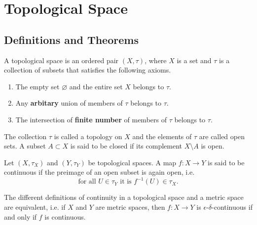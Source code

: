 \chapter{Topological Space}
\section{Definitions and Theorems}
\begin{defbox}
    \begin{definition}
        A {\color{maththen}topological space} is an {\color{mathobj}ordered pair} \((X, \tau)\), where \(X\) is a {\color{mathif}set} and \(\tau\) is a {\color{mathif}collection of subsets} that satisfies the following {\color{mathrem}axioms}.
        \begin{enumerate}
            \item The {\color{mathif}empty set} \(\varnothing\) and the {\color{mathif}entire set} \(X\) belongs to \(\tau\).
            \item Any \textbf{arbitary} {\color{mathif}union} of members of \(\tau\) belongs to \(\tau\).
            \item The {\color{mathif}intersection} of \textbf{finite number} of members of \(\tau\) belongs to \(\tau\).
        \end{enumerate}
        The {\color{mathobj}collection} \(\tau\) is called a {\color{maththen}topology} on \(X\) and the {\color{mathobj}elements} of \(\tau\) are called {\color{maththen}open sets}. A {\color{mathobj}subset} \(A \subset X\) is said to be {\color{maththen}closed} if its {\color{mathif}complement} \(X \setminus A\) is {\color{mathif}open}.
    \end{definition}
\end{defbox}

\begin{defbox}
    \begin{definition}
        Let \((X, \tau_X)\) and \((Y, \tau_Y)\) be {\color{mathif}topological spaces}. A {\color{mathif}map} \(f: X \longrightarrow Y\) is said to be {\color{maththen}continuous} if the preimage of an open subset is again open, i.e.
        \begin{equation}
            \text{for all } U \in \tau_Y \text{ it is } f^{-1}(U) \in \tau_X \text{.}
        \end{equation}
    \end{definition}
\end{defbox}
\begin{thmbox}
    \begin{lemma}
        The different definitions of continuity in a topological space and a metric space are equivalent, i.e. if \(X\) and \(Y\) are metric spaces, then \(f: X \longrightarrow Y\) is \(\epsilon\)-\(\delta\)-continuous if and only if \(f\) is continuous.
    \end{lemma}
\end{thmbox}

